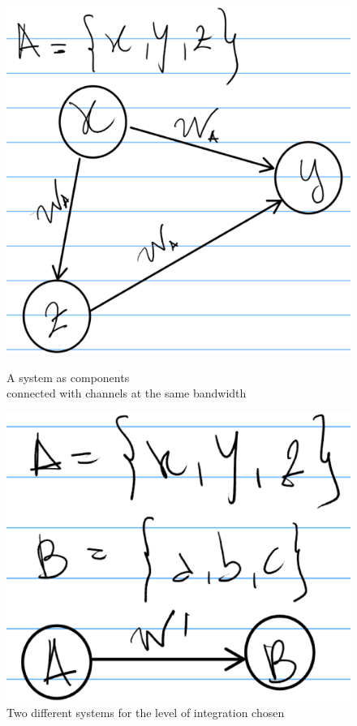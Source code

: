 \documentclass[14pt,a4paper]{extarticle}
\begin{document}
\newpage
\vspace{0.5cm}

\begin{figure}[htbp]
\begin{minipage}[t]{0.45\linewidth}
    \includegraphics[width=\linewidth]{Fig__1_connected_elements.eps}
	\caption{A system as components\\ connected with channels at the same bandwidth}%
	\label{fig:fig1}
\end{minipage}%
    \hfill%
\begin{minipage}[t]{0.45\linewidth}
    \includegraphics[width=\linewidth]{Fig__2_connected_groups-2.eps}
    \caption{Two different systems for the level of integration chosen}%
    \label{fig:fig2}
\end{minipage} 
\end{figure}
\end{document}
